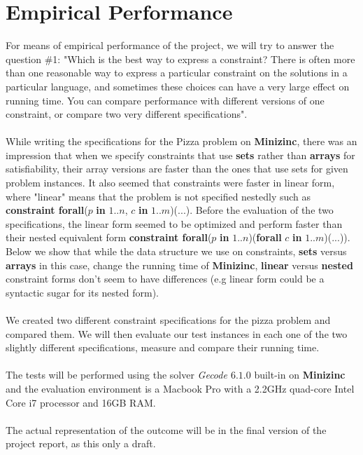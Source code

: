 \documentclass[conference]{IEEEtran}
\newcommand\tab[1][0.3cm]{\hspace*{#1}}
\begin{document}
\section{Empirical Performance}
For means of empirical performance of the project, we will try to answer the question \#1: "Which is the best way to express a constraint? There is often more than one reasonable way to express a particular constraint on the solutions in a particular language, and sometimes these choices can have a very large effect on running time. You can compare performance with different versions of one constraint, or compare two very different specifications".
\\
\\
\tab While writing the specifications for the Pizza problem on \textbf{Minizinc}, there was an impression that when we specify constraints that use \textbf{sets} rather than \textbf{arrays} for satisfiability, their array versions are faster than the ones that use sets for given problem instances. It also seemed that constraints were faster in linear form, where "linear" means that the problem is not specified nestedly such as \textbf{constraint forall}($p$ \textbf{in} $1..n$, $c$ \textbf{in} $1..m$)($...$). Before the evaluation of the two specifications, the linear form seemed to be optimized and perform faster than their nested equivalent form \textbf{constraint forall}($p$ \textbf{in} $1..n$)(\textbf{forall} $c$ \textbf{in} $1..m$)($...$)). Below we show that while the data structure we use on constraints, \textbf{sets} versus \textbf{arrays} in this case, change the running time of \textbf{Minizinc}, \textbf{linear} versus \textbf{nested} constraint forms don't seem to have differences (e.g linear form could be a syntactic sugar for its nested form).
\\
\\
\tab We created two different constraint specifications for the pizza problem and compared them. We will then evaluate our test instances in each one of the two slightly different specifications, measure and compare their running time.
\\
\\
\tab The tests will be performed using the solver \textit{Gecode $6.1.0$} built-in on \textbf{Minizinc} and the evaluation environment is a Macbook Pro with a 2.2GHz quad-core Intel Core i7 processor and 16GB RAM.
\\
\\
The actual representation of the outcome will be in the final version of the project report, as this only a draft.
\end{document}
